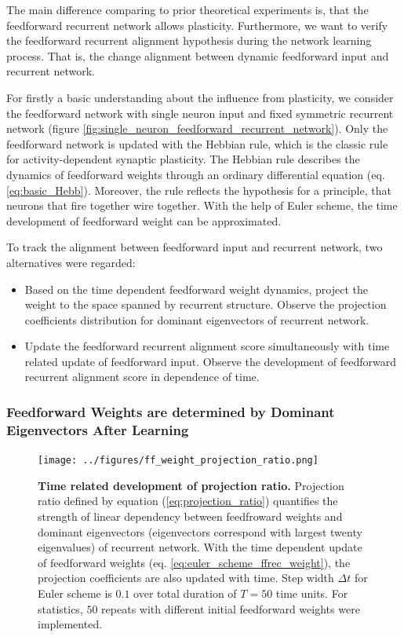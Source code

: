 \documentclass[11pt]{article}
\begin{document}
	The main difference comparing to prior theoretical experiments is, that the feedforward recurrent network allows plasticity. Furthermore, we want to verify the feedforward recurrent alignment hypothesis during the network learning process. That is, the change alignment between dynamic feedforward input and recurrent network. 
	
	For firstly a basic understanding about the influence from plasticity, we consider the feedforward network with single neuron input and fixed symmetric recurrent network (figure \ref{fig:single_neuron_feedforward_recurrent_network}). Only the feedforward network is updated with the Hebbian rule, which is the classic rule for activity-dependent synaptic plasticity. The Hebbian rule describes the dynamics of feedforward weights through an ordinary differential equation (eq. \ref{eq:basic_Hebb}). Moreover, the rule reflects the hypothesis for a principle, that neurons that fire together wire together. With the help of Euler scheme, the time development of feedforward weight can be approximated. 
	
	To track the alignment between feedforward input and recurrent network, two alternatives were regarded:
		\begin{itemize}
			\item Based on the time dependent feedforward weight dynamics, project the weight to the space spanned by recurrent structure. Observe the projection coefficients distribution for dominant eigenvectors of recurrent network.
			\item Update the feedforward recurrent alignment score simultaneously with time related update of feedforward input. Observe the development of feedforward recurrent alignment score in dependence of time. 
		\end{itemize}

	\subsubsection{Feedforward Weights are determined by Dominant Eigenvectors After Learning}
	
	
	
		\begin{figure}
			\centering
			\texttt{[image: ../figures/ff\_weight\_projection\_ratio.png]}
			\caption{\textbf{Time related development of projection ratio.} Projection ratio defined by equation (\ref{eq:projection_ratio}) quantifies the strength of linear dependency between feedfroward weights and dominant eigenvectors (eigenvectors correspond with largest twenty eigenvalues) of recurrent network. With the time dependent update of feedforward weights (eq. \ref{eq:euler_scheme_ffrec_weight}), the projection coefficients are also updated with time. Step width $\Delta t$ for Euler scheme is $0.1$ over total duration of $T=50$ time units. For statistics, $50$ repeats with different initial feedforward weights were implemented.}
		\end{figure}
	
\end{document}
